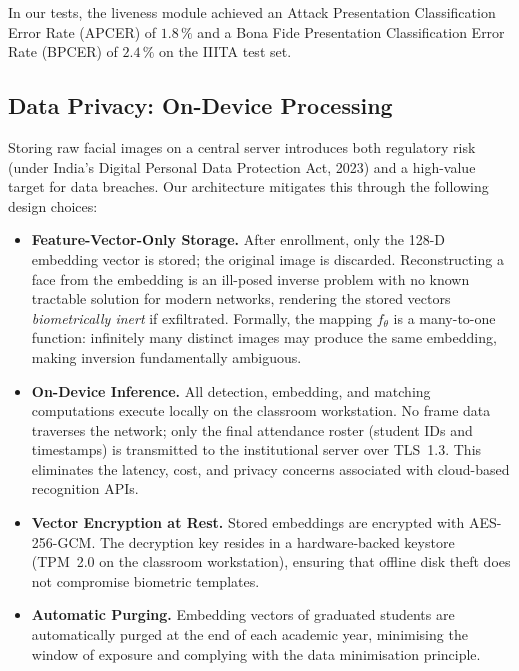 \documentclass[conference, 10pt]{IEEEtran}
\begin{document}
In our tests, the liveness module achieved an Attack Presentation Classification Error Rate
(APCER) of $1.8\,\%$ and a Bona Fide Presentation Classification Error Rate (BPCER) of
$2.4\,\%$ on the IIITA test set.

\subsection{Data Privacy: On-Device Processing}

Storing raw facial images on a central server introduces both regulatory risk (under India's
Digital Personal Data Protection Act, 2023) and a high-value target for data breaches.
Our architecture mitigates this through the following design choices:

\begin{itemize}
    \item \textbf{Feature-Vector-Only Storage.}  After enrollment, only the 128-D embedding
          vector is stored; the original image is discarded.  Reconstructing a face from the
          embedding is an ill-posed inverse problem with no known tractable solution for modern
          networks, rendering the stored vectors \emph{biometrically inert} if exfiltrated.
          Formally, the mapping $f_\theta$ is a many-to-one function: infinitely many distinct
          images may produce the same embedding, making inversion fundamentally ambiguous.
    \item \textbf{On-Device Inference.}  All detection, embedding, and matching computations
          execute locally on the classroom workstation.  No frame data traverses the network;
          only the final attendance roster (student IDs and timestamps) is transmitted to the
          institutional server over TLS~1.3.  This eliminates the latency, cost, and
          privacy concerns associated with cloud-based recognition APIs.
    \item \textbf{Vector Encryption at Rest.}  Stored embeddings are encrypted with AES-256-GCM.
          The decryption key resides in a hardware-backed keystore (TPM~2.0 on the classroom
          workstation), ensuring that offline disk theft does not compromise biometric templates.
    \item \textbf{Automatic Purging.}  Embedding vectors of graduated students are automatically
          purged at the end of each academic year, minimising the window of exposure and
          complying with the data minimisation principle.
\end{itemize}
\end{document}
